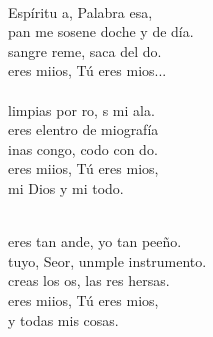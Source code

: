 \begin{cancion}%
	       \\
	Espíritu a, Palabra esa, \\
	pan me sosene doche y de día.\\
	sangre reme, saca del do.\\
	 eres miios, Tú eres mios...\\
\jump
	      \\
	limpias por ro, s mi ala. \\
	 eres elentro de miografía\\
	inas congo,  codo con do.\\
	 eres miios, Tú eres mios,\\
mi Dios y mi todo.\\\jump\\
	\begin{chorus}%
	 eres tan ande, yo  tan peeño. \\
	 tuyo, Seor, unmple instrumento.\\
	 creas los os, las res hersas.  \\
	 eres miios, Tú eres mios,\\
y todas mis cosas.\\
	\end{chorus}%
	\jump\\
	      \\

\end{cancion}
